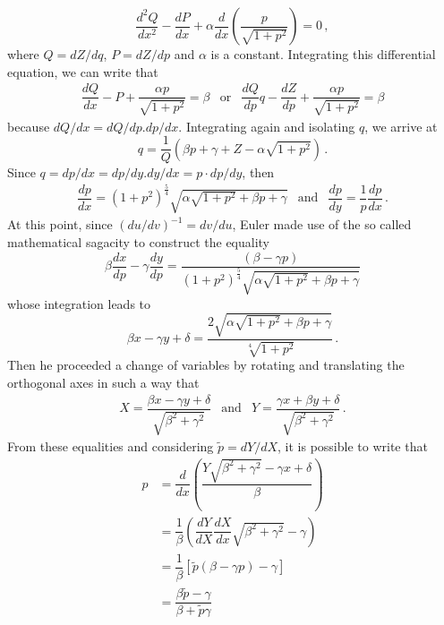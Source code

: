 \begin{equation*}
\dfrac{d^2Q}{dx^2} - \dfrac{dP}{dx} + \alpha \dfrac{d}{dx}(\dfrac{p}{\sqrt{1+p^2}}) = 0\,,
\end{equation*}
where $Q=d Z/d q$, $P=d Z/d p$ and $\alpha$ is a constant. Integrating this differential equation, we can write that
\begin{eqnarray*}
\dfrac{dQ}{dx} - P +  \dfrac{\alpha p}{\sqrt{1+p^2}} = \beta&\text{or}&\dfrac{dQ}{dp}q - \dfrac{dZ}{dp} +  \dfrac{\alpha p}{\sqrt{1+p^2}} = \beta
\end{eqnarray*}
because ${dQ}/{dx}={dQ}/{dp}.{dp}/{dx}$. Integrating again and isolating $q$, we arrive at 
\begin{equation*}
q = \dfrac{1}{Q}(\beta p + \gamma + Z -\alpha\sqrt{1+p^2})\,.
\end{equation*}
Since $q={dp}/{dx}={dp}/{dy}.{dy}/{dx}=p\cdot{dp}/{dy}$, then
\begin{eqnarray*}
\dfrac{dp}{dx}= (1+p^2)^{\frac{5}{4}} \sqrt{\alpha\sqrt{1+p^2}+\beta p + \gamma} &\text{and}& \dfrac{dp}{dy}= \dfrac{1}{p}\dfrac{dp}{dx}\,.
\end{eqnarray*}
At this point, since $({du}/{dv})^{-1}={dv}/{du}$, Euler made use of the so called mathematical sagacity to construct the equality 
\begin{equation*}
\beta \dfrac{dx}{dp} - \gamma \dfrac{dy}{dp} = \dfrac{(\beta-\gamma p)}{(1+p^2)^{\frac{5}{4}} \sqrt{\alpha\sqrt{1+p^2}+\beta p + \gamma}}
\end{equation*}
whose integration leads to 
\begin{equation}\label{eq:euler1}
\beta x - \gamma y + \delta = \dfrac{2\sqrt{\alpha\sqrt{1+p^2}+\beta p + \gamma}}{\sqrt[4]{1+p^2}}\,.
\end{equation}
Then he proceeded a change of variables by rotating and translating the orthogonal axes in such a way that               
\begin{eqnarray*}
X= \dfrac{\beta x - \gamma y+\delta}{\sqrt{\beta^2+\gamma^2}} &\text{and}& Y= \dfrac{\gamma x + \beta y+\delta}{\sqrt{\beta^2+\gamma^2}}\,.
\end{eqnarray*}
From these equalities and considering $\tilde{p}={dY}/{dX}$, it is possible to write that
\begin{align*}
p &= \dfrac{d}{dx}(\dfrac{Y\sqrt{\beta^2+\gamma^2}-\gamma x +\delta}{\beta})\\
&= \dfrac{1}{\beta}(\dfrac{dY}{dX}\dfrac{dX}{dx}\sqrt{\beta^2+\gamma^2}-\gamma)\\
 &= \dfrac{1}{\beta}[\tilde{p}(\beta-\gamma p)-\gamma]\\
&= \dfrac{\beta\tilde{p}-\gamma}{\beta+\tilde{p}\gamma}
\end{align*}
